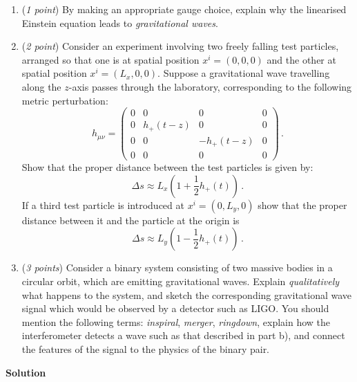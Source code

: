 \documentclass[12pt]{article}
\newcommand{\be}{\begin{equation}}
\newcommand{\ee}{\end{equation}}
\begin{document}
\begin{enumerate}[label=\alph*)]
\item (\emph{1 point}) By making an appropriate gauge choice, explain why the linearised Einstein equation leads to \emph{gravitational waves}.
\item (\emph{2 point}) Consider an experiment involving two freely falling test particles, arranged so that one is at spatial position $x^i = (0,0,0)$ and the other at spatial position $x^i=(L_x,0,0)$.
Suppose a gravitational wave travelling along the $z$-axis passes through the laboratory, corresponding to the following metric perturbation:
\be
h_{\mu\nu} = \begin{pmatrix}
0 & 0 & 0 & 0 \\
0 & h_{+}(t-z) & 0 & 0 \\
0 & 0 & - h_{+}(t-z) & 0 \\
0 & 0 & 0 & 0
\end{pmatrix} \,.
\ee
Show that the proper distance between the test particles is given by: 
\be
\Delta s \approx L_x \left( 1 + \frac{1}{2} h_{+}(t) \right) \,.
\ee
If a third test particle is introduced at $x^i=(0,L_y,0)$ show that the proper distance between it and the particle at the origin is
\be
\Delta s \approx L_y \left( 1 - \frac{1}{2} h_{+}(t) \right) \,.
\ee
\item (\emph{3 points}) Consider a binary system consisting of two massive bodies in a circular orbit, which are emitting gravitational waves.
Explain \emph{qualitatively} what happens to the system, and sketch the corresponding gravitational wave signal which would be observed by a detector such as LIGO.
You should mention the following terms: \emph{inspiral}, \emph{merger}, \emph{ringdown}, explain how the interferometer detects a wave such as that described in part b), and connect the features of the signal to the physics of the binary pair. 

\end{enumerate}
\color{red}
{\bf Solution}
\end{document}

